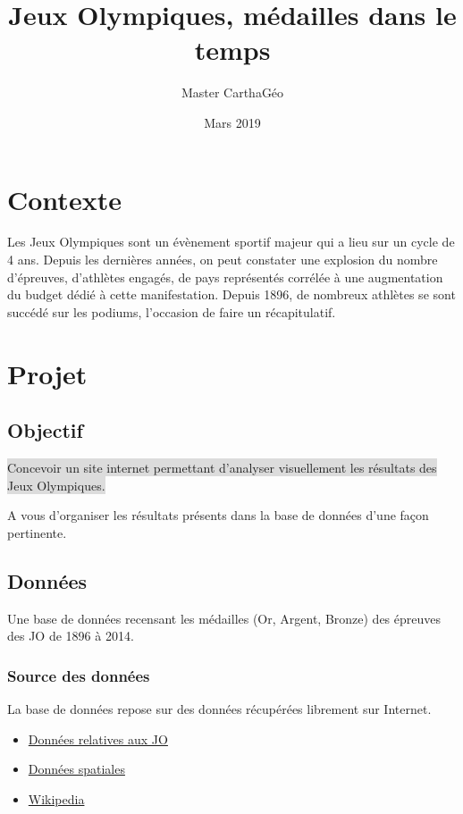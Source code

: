 \documentclass{article}
\title{Jeux Olympiques, médailles dans le temps}
\author{Master CarthaGéo}
\date{Mars 2019}
\begin{document}
\maketitle

\section{Contexte}

Les Jeux Olympiques sont un évènement sportif majeur qui a lieu sur un cycle de 4 ans. Depuis les dernières années, on peut constater une explosion du nombre d’épreuves, d’athlètes engagés, de pays représentés corrélée à une augmentation du budget dédié à cette manifestation.
Depuis 1896, de nombreux athlètes se sont succédé sur les podiums, l'occasion de faire un récapitulatif.

\section{Projet}

\subsection{Objectif}

\vspace{3mm}

\colorbox{Gainsboro}{
Concevoir un site internet permettant d’analyser visuellement les résultats des Jeux Olympiques.
}

\vspace{5mm}

A vous d'organiser les résultats présents dans la base de données d'une façon pertinente.

\subsection{Données}

Une base de données recensant les médailles (Or, Argent, Bronze) des épreuves des JO de 1896 à 2014.

\subsubsection{Source des données}

La base de données repose sur des données récupérées librement sur Internet.

\begin{itemize}

\item
\href{https://www.kaggle.com/the-guardian/olympic-games/home}{Données relatives aux JO}

\item
\href{http://www.naturalearthdata.com/downloads/10m-cultural-vectors/10m-admin-0-details/}{Données spatiales}

\item
\href{http://www.wikipedia.org}{Wikipedia}

\end{itemize}
\end{document}

